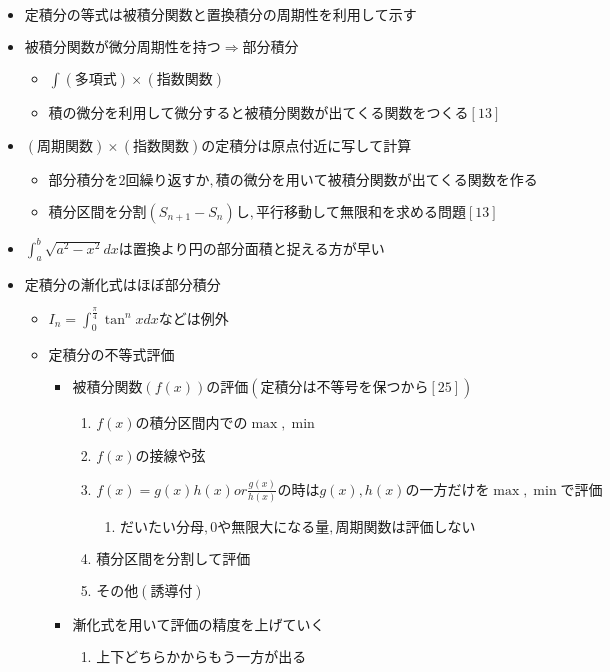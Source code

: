 \documentclass[dvipdfmx,uplatex]{jsarticle}
\begin{document}
\begin{itemize}
\begin{itemize}
\begin{itemize}
		\end{itemize}
		\item $ 定積分の等式は被積分関数と置換積分の周期性を利用して示す$
		\item $ 被積分関数が微分周期性を持つ⇒部分積分$
		\begin{itemize}
			\item $ \int (多項式) \times (指数関数)$
			\item $ 積の微分を利用して微分すると被積分関数が出てくる関数をつくる[13]$
		\end{itemize}
		\item $ (周期関数) \times (指数関数) の定積分は原点付近に写して計算$
		\begin{itemize}
			\item $ 部分積分を2回繰り返すか,積の微分を用いて被積分関数が出てくる関数を作る$
			\item $ 積分区間を分割(S_{n+1} - S_n)し,平行移動して無限和を求める問題 [13]$
		\end{itemize}
		\item $ \int^b_a \sqrt{a^2 - x^2}dx は置換より円の部分面積と捉える方が早い$
		\item $ 定積分の漸化式はほぼ部分積分$
		\begin{itemize}
			\item $ I_n = \int^{\frac{\pi}{4}}_0 \tan^n x dx などは例外$
			\item $ 定積分の不等式評価$
			\begin{itemize}
				\item $ 被積分関数(f(x))の評価 (定積分は不等号を保つから [25])$
				\begin{enumerate}
					\item $ f(x)の積分区間内での\max, \min$
					\item $ f(x)の接線や弦$
					\item $ f(x) = g(x)h(x) or \frac{g(x)}{h(x)} の時は g(x), h(x) の一方だけを \max , \min で評価$
					\begin{enumerate}
						\item $ だいたい分母, 0や無限大になる量, 周期関数は評価しない$
					\end{enumerate}
					\item $ 積分区間を分割して評価$
					\item $ その他(誘導付)$
				\end{enumerate}
				\item $ 漸化式を用いて評価の精度を上げていく$
				\begin{enumerate}
					\item $ 上下どちらかからもう一方が出る$

\end{enumerate}
\end{itemize}
\end{itemize}
\end{itemize}
\end{itemize}
\end{document}

